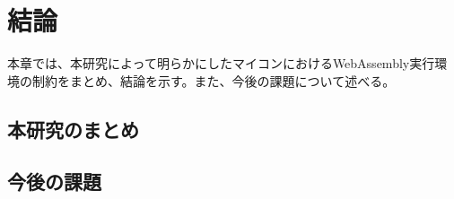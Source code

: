 \chapter{結論}
\label{chap:conclusion}

本章では、本研究によって明らかにしたマイコンにおけるWebAssembly実行環境の制約をまとめ、結論を示す。また、今後の課題について述べる。

\section{本研究のまとめ}
\label{section:matome}

\section{今後の課題}
